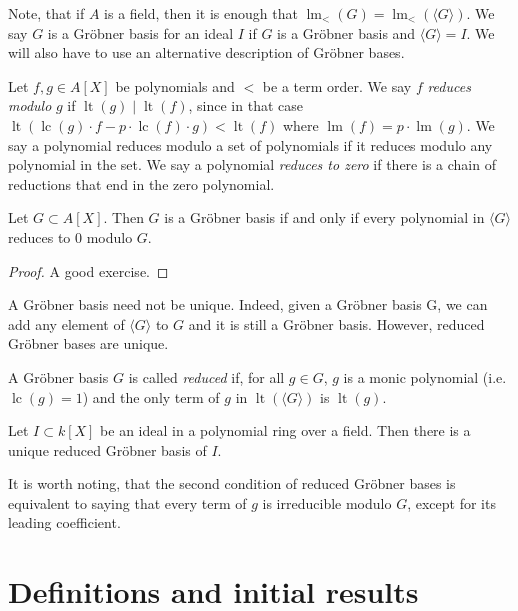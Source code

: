 \documentclass[a4paper, 12pt]{article}
\DeclareMathOperator{\LT}{lt}
\DeclareMathOperator{\LM}{lm}
\DeclareMathOperator{\LC}{lc}
\theoremstyle{changedot}
\theoremstyle{changedotbreak}
\theoremstyle{nonumberplain}
\newtheorem{proof}{Proof}
\begin{document}
Note, that if $A$ is a field, then it is enough that $\LM_{<}(G) = \LM_{<}(\langle G \rangle)$. We say $G$ is a Gröbner basis for an ideal $I$ if $G$ is a Gröbner basis and $\langle G \rangle = I$. We will also have to use an alternative description of Gröbner bases.

\begin{definition}
  Let $f, g \in A[X]$ be polynomials and $<$ be a term order. We say $f$ \textit{reduces modulo} $g$ if $\LT(g) \mid \LT(f)$, since in that case $\LT(\LC(g)\cdot f - p\cdot \LC(f) \cdot g) < \LT(f)$ where $\LM(f) = p \cdot \LM(g)$. We say a polynomial reduces modulo a set of polynomials if it reduces modulo any polynomial in the set. We say a polynomial \textit{reduces to zero} if there is a chain of reductions that end in the zero polynomial.
\end{definition}

\begin{theorem}\label{thm:grb}
  Let $G \subset A[X]$. Then $G$ is a Gröbner basis if and only if every polynomial in $\langle G \rangle$ reduces to 0 modulo $G$.
\end{theorem}
\begin{proof}
  A good exercise.
\end{proof}

A Gröbner basis need not be unique. Indeed, given a Gröbner basis G, we can add any element of $\langle G \rangle$ to $G$ and it is still a Gröbner basis. However, reduced Gröbner bases are unique.

\begin{definition}
  A Gröbner basis $G$ is called \textit{reduced} if, for all $g \in G$, $g$ is a monic polynomial (i.e. $\LC(g) = 1$) and the only term of $g$ in $\LT(\langle G \rangle)$ is $\LT(g)$.
\end{definition}
\begin{theorem}
  Let $I \subset k[X]$ be an ideal in a polynomial ring over a field. Then there is a unique reduced Gröbner basis of $I$.
\end{theorem}

It is worth noting, that the second condition of reduced Gröbner bases is equivalent to saying that every term of $g$ is irreducible modulo $G$, except for its leading coefficient.



\section{Definitions and initial results}
\end{document}
